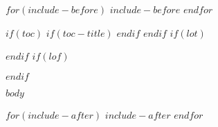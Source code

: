 \documentclass[12pt,a4paper,$for(classoption)$$classoption$$sep$,$endfor$]{$documentclass$}
\begin{document}
$for(include-before)$
$include-before$
$endfor$

$if(toc)$
{
$if(toc-title)$
\renewcommand*\contentsname{$toc-title$}
$endif$
\setcounter{tocdepth}{$toc-depth$}
\tableofcontents
}
$endif$
$if(lot)$
\listoftables
$endif$
$if(lof)$
\listoffigures
$endif$

$body$

% 
%
%




$for(include-after)$
  $include-after$
$endfor$
\end{document}
